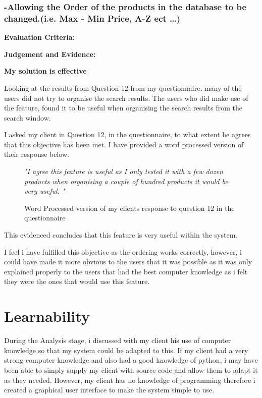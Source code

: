 \pagebreak
\subsubsection{-Allowing the Order of the products in the database to be changed.(i.e. Max - Min Price, A-Z ect \ldots)}\textbf{Evaluation Criteria:} \newline

\textbf{Judgement and Evidence:} \newline

\textbf{\large{My solution is effective}}

Looking at the results from Question 12 from my questionnaire, many of the users did not try to organise the search results. The users who did make use of the feature, found it to be useful when organising the search results from the search window. 

I asked my client in Question 12, in the questionnaire, to what extent he agrees that this objective has been met. I have provided a word processed version of their response below:

\begin{figure}[H]
\caption{Word Processed version of my clients response to question 12 in the questionnaire} \label{client-evidence-Q3}
\vspace{3mm}
\textit{\large{"I agree this feature is useful as I only tested it with a few dozen products when organising a couple of hundred products it would be very useful. "}}
\vspace{3mm}
\end{figure}

This evidenced concludes that this feature is very useful within the system.

I feel i have fulfilled this objective as the ordering works correctly, however, i could have made it more obvious to the users that it was possible as it was only explained properly to the users that had the best computer knowledge as i felt they were the ones that would use this feature.



\section{Learnability}

During the Analysis stage, i discussed with my client his use of computer knowledge so that my system could be adapted to this. If my client had a very strong computer knowledge and also had a good knowledge of python, i may have been able to simply supply my client with source code and allow them to adapt it as they needed. However, my client has no knowledge of programming therefore i created a graphical user interface to make the system simple to use.

